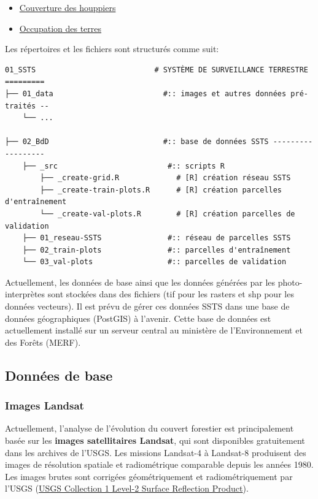\documentclass[a4paper, notitlepage, 12pt, krantz2]{krantz}
\makeatletter
\providecommand{\tightlist}{%
  \setlength{\itemsep}{0pt}\setlength{\parskip}{0pt}}
\newenvironment{kframe}{%
\medskip{}
\setlength{\fboxsep}{.8em}
 \def\at@end@of@kframe{}%
 \ifinner\ifhmode%
  \def\at@end@of@kframe{\end{minipage}}%
  \begin{minipage}{\columnwidth}%
 \fi\fi%
 \def\FrameCommand##1{\hskip\@totalleftmargin \hskip-\fboxsep
 \colorbox{shadecolor}{##1}\hskip-\fboxsep
     \hskip-\linewidth \hskip-\@totalleftmargin \hskip\columnwidth}%
 \MakeFramed {\advance\hsize-\width
   \@totalleftmargin\z@ \linewidth\hsize
   \@setminipage}}%
 {\par\unskip\endMakeFramed%
 \at@end@of@kframe}
\newenvironment{rmdblock}[1]
  {
  \begin{itemize}
  \renewcommand{\labelitemi}{
    \raisebox{-.7\height}[0pt][0pt]{
      {\setkeys{Gin}{width=3em,keepaspectratio}\texttt{[image: images/icons/\#1]}}
    }
  }
  \setlength{\fboxsep}{1em}
  \begin{kframe}
  \item
  }
  {
  \end{kframe}
  \end{itemize}
  }
\newenvironment{rmdtodo}
  {\begin{rmdblock}{todo}}
  {\end{rmdblock}}
\makeatother
\begin{document}
\begin{itemize}
\tightlist
\item
  \protect\hyperlink{SSTS-couverture-houppiers}{Couverture des houppiers}
\item
  \protect\hyperlink{SSTS-occupation-terres}{Occupation des terres}
\end{itemize}

Les répertoires et les fichiers sont structurés comme suit:

\begin{verbatim}
01_SSTS                           # SYSTÈME DE SURVEILLANCE TERRESTRE =========
├── 01_data                         #:: images et autres données pré-traités --
    └── ...
            
├── 02_BdD                          #:: base de données SSTS ------------------
    ├── _src                         #:: scripts R
        ├── _create-grid.R             # [R] création réseau SSTS
        ├── _create-train-plots.R      # [R] création parcelles d'entraînement
        └── _create-val-plots.R        # [R] création parcelles de validation
    ├── 01_reseau-SSTS               #:: réseau de parcelles SSTS
    ├── 02_train-plots               #:: parcelles d'entraînement
    └── 03_val-plots                 #:: parcelles de validation
\end{verbatim}

\begin{rmdtodo}
Actuellement, les données de base ainsi que les données générées par les
photo-interprètes sont stockées dans des fichiers (tif pour les rasters
et shp pour les données vecteurs). Il est prévu de gérer ces données
SSTS dans une base de données géographiques (PostGIS) à l'avenir. Cette
base de données est actuellement installé sur un serveur central au
ministère de l'Environnement et des Forêts (MERF).
\end{rmdtodo}

\hypertarget{SSTS-BdD}{%
\subsection{Données de base}\label{SSTS-BdD}}

\hypertarget{SSTS-Landsat}{%
\subsubsection{Images Landsat}\label{SSTS-Landsat}}

Actuellement, l'analyse de l'évolution du couvert forestier est principalement basée sur les \textbf{images satellitaires Landsat}, qui sont disponibles gratuitement dans les archives de l'USGS. Les missions Landsat-4 à Landsat-8 produisent des images de résolution spatiale et radiométrique comparable depuis les années 1980. Les images brutes sont corrigées géométriquement et radiométriquement par l'USGS (\href{https://www.usgs.gov/land-resources/nli/landsat/landsat-surface-reflectance}{USGS Collection 1 Level-2 Surface Reflection Product}).
\end{document}
